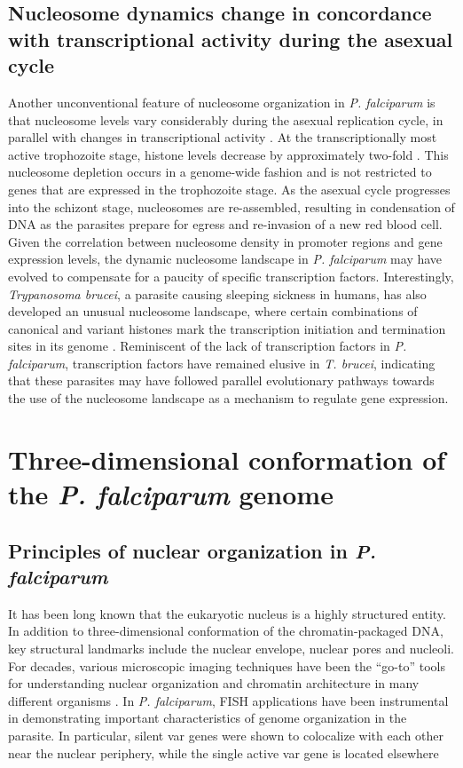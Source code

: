 \subsection{Nucleosome dynamics change in concordance with transcriptional
activity during the asexual cycle}

Another unconventional feature of nucleosome organization in \textit{P.
falciparum} is that nucleosome levels vary considerably during the asexual
replication cycle, in parallel with changes in transcriptional activity
\citep{bunnik:DNA-encoded, ponts:nucleosome}.
At the transcriptionally most active trophozoite stage, histone
levels decrease by approximately two-fold 
\citep{bunnik:DNA-encoded, ponts:nucleosome}. This nucleosome depletion
occurs in a genome-wide fashion and is not restricted to genes that are
expressed in the trophozoite stage. As the asexual cycle progresses into the
schizont stage, nucleosomes are re-assembled, resulting in condensation of DNA
as the parasites prepare for egress and re-invasion of a new red blood cell.
Given the correlation between nucleosome density in promoter regions and gene
expression levels, the dynamic nucleosome landscape in \textit{P. falciparum} may have
evolved to compensate for a paucity of specific transcription factors.
Interestingly, \textit{Trypanosoma brucei}, a parasite causing sleeping sickness in
humans, has also developed an unusual nucleosome landscape, where certain
combinations of canonical and variant histones mark the transcription
initiation and termination sites in its genome \citep{siegel:four}.
Reminiscent of the lack
of transcription factors in \textit{P. falciparum}, transcription factors have remained
elusive in \textit{T. brucei}, indicating that these parasites may have followed
parallel evolutionary pathways towards the use of the nucleosome landscape as
a mechanism to regulate gene expression.


\section{Three-dimensional conformation of the \textit{P. falciparum} genome}

\subsection{Principles of nuclear organization in \textit{P. falciparum}}

It has been long known that the eukaryotic nucleus is a highly structured
entity. In addition to three-dimensional conformation of the
chromatin-packaged DNA, key structural landmarks include the nuclear envelope,
nuclear pores and nucleoli. For decades, various microscopic imaging
techniques have been the “go-to” tools for understanding nuclear organization
and chromatin architecture in many different organisms
\citep{cremer:chromosome, misteli:beyond, takizawa:meaning}. In \textit{P.
falciparum}, FISH applications have been instrumental in demonstrating
important characteristics of genome organization in the parasite. In
particular, silent var genes were shown to colocalize with each other near the
nuclear periphery, while the single active var gene is located elsewhere

